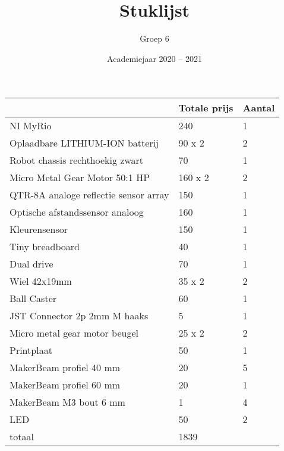 \documentclass[a4paper,kulak]{kulakarticle} %
\date{Academiejaar 2020 -- 2021}
\title{Stuklijst}
\author{Groep 6}
\begin{document}
\maketitle
\hfill
\hfill
\hfill

\begin{center}
	\begin{tabular}{|l|l|l|}
		\hline
		 & Totale prijs & Aantal \\ \hline
		 NI MyRio & 240 & 1 \\ \hline
		 Oplaadbare LITHIUM-ION batterij & 90 x 2 & 2 \\ \hline
		 Robot chassis rechthoekig zwart & 70 & 1 \\ \hline
		 Micro Metal Gear Motor 50:1 HP & 160 x 2 & 2 \\ \hline
		 QTR-8A analoge reflectie sensor array & 150 & 1 \\ \hline
		 Optische afstandssensor analoog & 160 & 1 \\ \hline 
		 Kleurensensor & 150 & 1 \\ \hline
		 Tiny breadboard & 40 & 1 \\ \hline
		 Dual drive & 70 & 1 \\ \hline 
		 Wiel 42x19mm & 35 x 2 & 2 \\ \hline
		 Ball Caster & 60 & 1 \\ \hline
		 JST Connector 2p 2mm M haaks & 5 & 1 \\ \hline
		 Micro metal gear motor beugel
& 25 x 2 & 2 \\ \hline
		 Printplaat & 50 & 1 \\ \hline
		 MakerBeam profiel 40 mm & 20 & 5 \\ \hline
		 MakerBeam profiel 60 mm & 20 & 1 \\ \hline
		 MakerBeam M3 bout 6 mm & 1 & 4 \\ \hline
		 LED & 50 & 2 \\ \hline
		 totaal & 1839 & \texttt{} \\ \hline
		    
		
		
	\end{tabular}
\end{center}
\end{document}
